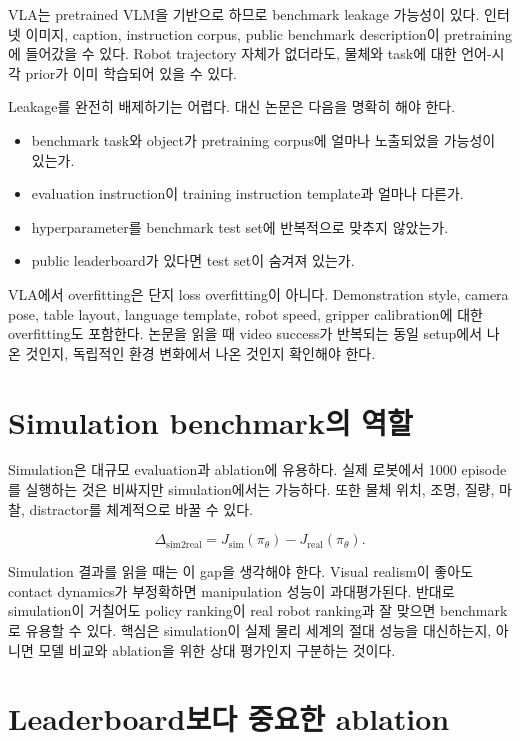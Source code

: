 VLA는 pretrained VLM을 기반으로 하므로 benchmark leakage 가능성이 있다. 인터넷 이미지, caption, instruction corpus, public benchmark description이 pretraining에 들어갔을 수 있다. Robot trajectory 자체가 없더라도, 물체와 task에 대한 언어-시각 prior가 이미 학습되어 있을 수 있다.

Leakage를 완전히 배제하기는 어렵다. 대신 논문은 다음을 명확히 해야 한다.

\begin{itemize}
  \item benchmark task와 object가 pretraining corpus에 얼마나 노출되었을 가능성이 있는가.
  \item evaluation instruction이 training instruction template과 얼마나 다른가.
  \item hyperparameter를 benchmark test set에 반복적으로 맞추지 않았는가.
  \item public leaderboard가 있다면 test set이 숨겨져 있는가.
\end{itemize}

VLA에서 overfitting은 단지 loss overfitting이 아니다. Demonstration style, camera pose, table layout, language template, robot speed, gripper calibration에 대한 overfitting도 포함한다. 논문을 읽을 때 video success가 반복되는 동일 setup에서 나온 것인지, 독립적인 환경 변화에서 나온 것인지 확인해야 한다.

\section{Simulation benchmark의 역할}

Simulation은 대규모 evaluation과 ablation에 유용하다. 실제 로봇에서 1000 episode를 실행하는 것은 비싸지만 simulation에서는 가능하다. 또한 물체 위치, 조명, 질량, 마찰, distractor를 체계적으로 바꿀 수 있다.

\begin{equation}
  \Delta_{\mathrm{sim2real}}
  =
  J_{\mathrm{sim}}(\pi_\theta)
  -
  J_{\mathrm{real}}(\pi_\theta).
\end{equation}

Simulation 결과를 읽을 때는 이 gap을 생각해야 한다. Visual realism이 좋아도 contact dynamics가 부정확하면 manipulation 성능이 과대평가된다. 반대로 simulation이 거칠어도 policy ranking이 real robot ranking과 잘 맞으면 benchmark로 유용할 수 있다. 핵심은 simulation이 실제 물리 세계의 절대 성능을 대신하는지, 아니면 모델 비교와 ablation을 위한 상대 평가인지 구분하는 것이다.

\section{Leaderboard보다 중요한 ablation}

